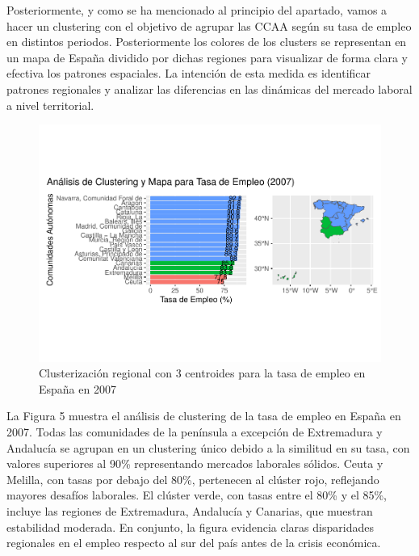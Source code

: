 \documentclass[Universitat de
València,article,submit,moreauthors,pdftex]{Definitions/mdpi}
\begin{document}
Posteriormente, y como se ha mencionado al principio del apartado, vamos
a hacer un clustering con el objetivo de agrupar las CCAA según su tasa
de empleo en distintos periodos. Posteriormente los colores de los
clusters se representan en un mapa de España dividido por dichas
regiones para visualizar de forma clara y efectiva los patrones
espaciales. La intención de esta medida es identificar patrones
regionales y analizar las diferencias en las dinámicas del mercado
laboral a nivel territorial.\newline

\begin{figure}[h]

{\centering \includegraphics[width=0.9\linewidth]{ProyectoAED2024_files/figure-latex/unnamed-chunk-35-1} 

}

\caption{Clusterización regional con 3 centroides para la tasa de empleo en España en 2007}\label{fig:unnamed-chunk-35}
\end{figure}

La Figura 5 muestra el análisis de clustering de la tasa de empleo en
España en 2007. Todas las comunidades de la península a excepción de
Extremadura y Andalucía se agrupan en un clustering único debido a la
similitud en su tasa, con valores superiores al 90\% representando
mercados laborales sólidos. Ceuta y Melilla, con tasas por debajo del
80\%, pertenecen al clúster rojo, reflejando mayores desafíos laborales.
El clúster verde, con tasas entre el 80\% y el 85\%, incluye las
regiones de Extremadura, Andalucía y Canarias, que muestran estabilidad
moderada. En conjunto, la figura evidencia claras disparidades
regionales en el empleo respecto al sur del país antes de la crisis
económica.\newline
\end{document}
